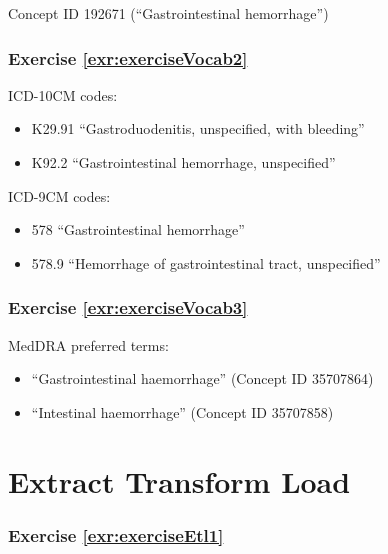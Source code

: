 \documentclass[11pt]{book}
\providecommand{\tightlist}{%
  \setlength{\itemsep}{0pt}\setlength{\parskip}{0pt}}
\theoremstyle{definition}
\theoremstyle{definition}
\theoremstyle{definition}
\theoremstyle{remark}
\begin{document}
Concept ID 192671 (``Gastrointestinal hemorrhage'')

\subsubsection*{Exercise
\ref{exr:exerciseVocab2}}\label{exercise-refexrexercisevocab2}

ICD-10CM codes:

\begin{itemize}
\tightlist
\item
  K29.91 ``Gastroduodenitis, unspecified, with bleeding''
\item
  K92.2 ``Gastrointestinal hemorrhage, unspecified''
\end{itemize}

ICD-9CM codes:

\begin{itemize}
\tightlist
\item
  578 ``Gastrointestinal hemorrhage''
\item
  578.9 ``Hemorrhage of gastrointestinal tract, unspecified''
\end{itemize}

\subsubsection*{Exercise
\ref{exr:exerciseVocab3}}\label{exercise-refexrexercisevocab3}

MedDRA preferred terms:

\begin{itemize}
\tightlist
\item
  ``Gastrointestinal haemorrhage'' (Concept ID 35707864)
\item
  ``Intestinal haemorrhage'' (Concept ID 35707858)
\end{itemize}

\section{Extract Transform Load}\label{Etlanswers}

\subsubsection*{Exercise
\ref{exr:exerciseEtl1}}\label{exercise-refexrexerciseetl1}
\end{document}
